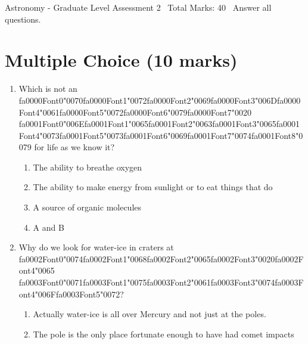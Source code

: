 \documentclass[12pt]{article}
\begin{document}
\begin{center}
Astronomy - Graduate Level Assessment 2 \
Total Marks: 40 \
Answer all questions.
\end{center}

\section*{Multiple Choice (10 marks)}
\begin{enumerate}[label=\arabic*.]
\item Which is not an {\csname fa0000Font0\endcsname\char"0070}{\csname fa0000Font1\endcsname\char"0072}{\csname fa0000Font2\endcsname\char"0069}{\csname fa0000Font3\endcsname\char"006D}{\csname fa0000Font4\endcsname\char"0061}{\csname fa0000Font5\endcsname\char"0072}{\csname fa0000Font6\endcsname\char"0079}{\csname fa0000Font7\endcsname\char"0020} {\csname fa0001Font0\endcsname\char"006E}{\csname fa0001Font1\endcsname\char"0065}{\csname fa0001Font2\endcsname\char"0063}{\csname fa0001Font3\endcsname\char"0065}{\csname fa0001Font4\endcsname\char"0073}{\csname fa0001Font5\endcsname\char"0073}{\csname fa0001Font6\endcsname\char"0069}{\csname fa0001Font7\endcsname\char"0074}{\csname fa0001Font8\endcsname\char"0079} for life as we know it?
\begin{enumerate}[label=(\alph*)]
    \item The ability to breathe oxygen
    \item The ability to make energy from sunlight or to eat things that do
    \item A source of organic molecules
    \item A and B
\end{enumerate}
\item Why do we look for water-ice in craters at {\csname fa0002Font0\endcsname\char"0074}{\csname fa0002Font1\endcsname\char"0068}{\csname fa0002Font2\endcsname\char"0065}{\csname fa0002Font3\endcsname\char"0020}{\csname fa0002Font4\endcsname\char"0065} {\csname fa0003Font0\endcsname\char"0071}{\csname fa0003Font1\endcsname\char"0075}{\csname fa0003Font2\endcsname\char"0061}{\csname fa0003Font3\endcsname\char"0074}{\csname fa0003Font4\endcsname\char"006F}{\csname fa0003Font5\endcsname\char"0072}?
\begin{enumerate}[label=(\alph*)]
    \item Actually water-ice is all over Mercury and not just at the poles.
    \item The pole is the only place fortunate enough to have had comet impacts

\end{enumerate}
\end{enumerate}
\end{document}
